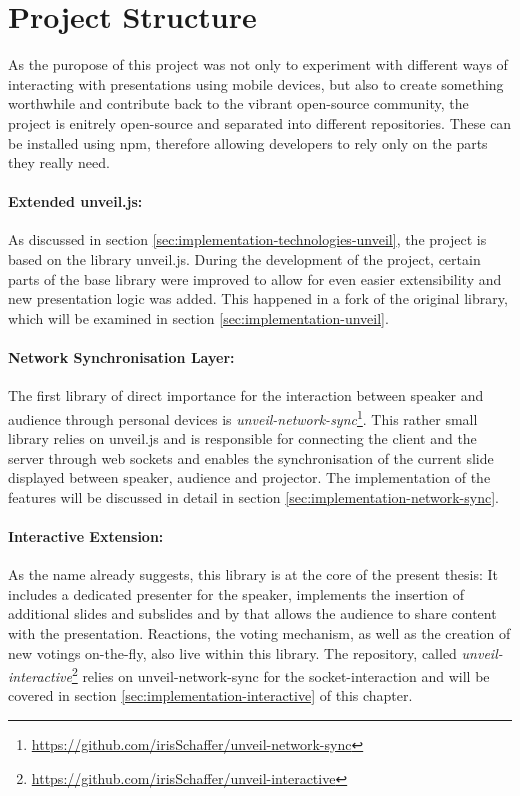 \section{Project Structure}
\label{sec:implementation-structure}

As the puropose of this project was not only to experiment with different ways of interacting with presentations using mobile devices, but also to create something worthwhile and contribute back to the vibrant open-source community, the project is enitrely open-source and separated into different repositories. These can be installed using npm, therefore allowing developers to rely only on the parts they really need.

\paragraph{Extended unveil.js:} As discussed in section \ref{sec:implementation-technologies-unveil}, the project is based on the library unveil.js. During the development of the project, certain parts of the base library were improved to allow for even easier extensibility and new presentation logic was added. This happened in a fork of the original library, which will be examined in section \ref{sec:implementation-unveil}.

\paragraph{Network Synchronisation Layer:} The first library of direct importance for the interaction between speaker and audience through personal devices is \textit{unveil-network-sync}\footnote{\url{https://github.com/irisSchaffer/unveil-network-sync}}. This rather small library relies on unveil.js and is responsible for connecting the client and the server through web sockets and enables the synchronisation of the current slide displayed between speaker, audience and projector. The implementation of the features will be discussed in detail in section \ref{sec:implementation-network-sync}.

\paragraph{Interactive Extension:} As the name already suggests, this library is at the core of the present thesis: It includes a dedicated presenter for the speaker, implements the insertion of additional slides and subslides and by that allows the audience to share content with the presentation. Reactions, the voting mechanism, as well as the creation of new votings on-the-fly, also live within this library. The repository, called \emph{unveil-interactive}\footnote{\url{https://github.com/irisSchaffer/unveil-interactive}} relies on unveil-network-sync for the socket-interaction and will be covered in section \ref{sec:implementation-interactive} of this chapter.

